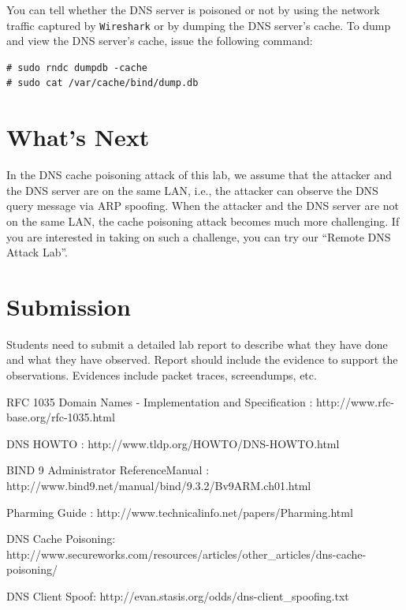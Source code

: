You can tell whether the DNS server is poisoned or not by using the network 
traffic captured by {\tt Wireshark} or by
dumping the DNS server's cache. To dump and view the DNS server's cache, issue
the following command:
\begin{verbatim}
# sudo rndc dumpdb -cache
# sudo cat /var/cache/bind/dump.db
\end{verbatim}


\section{What's Next}


In the DNS cache poisoning attack of this lab, 
we assume that the attacker and the DNS server are on
the same LAN, i.e., the attacker can observe the DNS query message
via ARP spoofing.
When the attacker and the DNS server are not on the same LAN,
the cache poisoning attack becomes much more challenging. If you
are interested in taking on such a challenge, you can 
try our ``Remote DNS Attack Lab''.




\section{Submission}

Students need to submit a detailed lab report to describe what they have done and
what they have observed. Report should include the evidence to support 
the observations. Evidences include packet traces, screendumps, etc.
 
\begin{thebibliography}{10}

RFC 1035 Domain Names - Implementation and Specification :
\newblock http://www.rfc-base.org/rfc-1035.html

DNS HOWTO :
\newblock http://www.tldp.org/HOWTO/DNS-HOWTO.html

BIND 9 Administrator ReferenceManual :
\newblock http://www.bind9.net/manual/bind/9.3.2/Bv9ARM.ch01.html

Pharming Guide :
\newblock http://www.technicalinfo.net/papers/Pharming.html

DNS Cache Poisoning:
\newblock http://www.secureworks.com/resources/articles/other\_articles/dns-cache-poisoning/

DNS Client Spoof:
\newblock http://evan.stasis.org/odds/dns-client\_spoofing.txt


\end{thebibliography}

